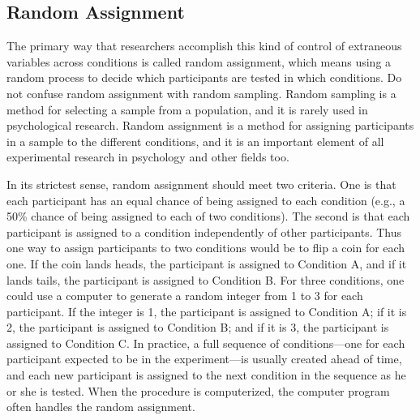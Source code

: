 \subsection{Random Assignment}

The primary way that researchers accomplish this kind of control of extraneous variables across conditions is called random assignment, which means using a random process to decide which participants are tested in which conditions. Do not confuse random assignment with random sampling. Random sampling is a method for selecting a sample from a population, and it is rarely used in psychological research. Random assignment is a method for
assigning participants in a sample to the different conditions, and it is an important element of all experimental research in psychology and other fields too.

In its strictest sense, random assignment should meet two criteria. One is that each participant has an equal chance of being assigned to each condition (e.g., a 50\% chance of being assigned to each of two conditions). The second is that each participant is assigned to a condition independently of other participants. Thus one way to assign participants to two conditions would be to flip a coin for each one. If the coin lands heads, the participant is assigned to Condition A, and if it lands tails, the participant is assigned to Condition B. For three conditions, one could use a computer to generate a random integer from 1 to 3 for each participant. If the integer is 1, the participant is assigned to Condition A; if it is 2, the participant is assigned to Condition B; and if it is 3, the participant is assigned to Condition C. In practice, a full sequence of conditions---one for each participant expected to be in the experiment---is usually created ahead of time, and each new participant is assigned to the next condition in the sequence as he or she is tested. When the procedure is computerized, the computer program often handles the random assignment.

